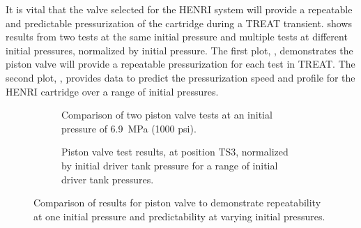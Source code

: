 It is vital that the valve selected for the HENRI system will provide a repeatable and predictable pressurization of the cartridge during a TREAT transient.  shows results from two tests at the same initial pressure and multiple tests at different initial pressures, normalized by initial pressure. The first plot, , demonstrates the piston valve will provide a repeatable pressurization for each test in TREAT. The second plot, , provides data to predict the pressurization speed and profile for the HENRI cartridge over a range of initial pressures.


\begin{figure}[tb]
    \centering
    \begin{subfigure}[t]{0.45\textwidth}
        \centering
        \caption{Comparison of two piston valve tests at an initial pressure of \SI{6.9}{\mega\pascal} (1000 psi).}
        \label{fig:piston 2 test}
    \end{subfigure}
    \hfill
    \begin{subfigure}[t]{0.45\textwidth}
        \centering
        \caption{Piston valve test results, at position TS3, normalized by initial driver tank pressure for a range of initial driver tank pressures.}
        \label{fig:norm}
    \end{subfigure}
    \caption{Comparison of results for piston valve to demonstrate repeatability at one initial pressure and predictability at varying initial pressures.}
    \label{fig:piston repeatability}
\end{figure}

